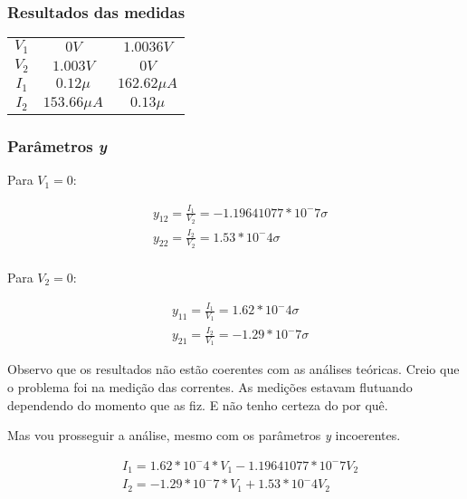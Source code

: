 \documentclass[12pt,twoside, a4paper, twocolumn]{article}
\begin{document}
\subsubsection{Resultados das medidas}


\begin{center}
    \begin{tabular}{ |c|c|c| }
        \hline
        $V_1$ & $0 V$          & $1.0036 V$     \\
        $V_2$ & $1.003 V$      & $0 V$          \\
        $I_1$ & $0.12 \mu$     & $162.62 \mu A$ \\
        $I_2$ & $153.66 \mu A$ & $0.13 \mu$     \\
        \hline
    \end{tabular}
\end{center}


\subsubsection{Parâmetros \emph{y}}


Para $V_1 = 0$:


\begin{equation}
    \begin{aligned}
         & y_{12} = \frac{I_1}{V_2} =  -1.19641077 * 10^-7 \sigma \\
         & y_{22} = \frac{I_2}{V_2} = 1.53 * 10^-4 \sigma         \\
    \end{aligned}
\end{equation}


Para $V_2 = 0$:


\begin{equation}
    \begin{aligned}
         & y_{11} = \frac{I_1}{V_1} = 1.62 * 10^-4 \sigma  \\
         & y_{21} = \frac{I_2}{V_1} = -1.29 * 10^-7 \sigma
    \end{aligned}
\end{equation}


Observo que os resultados não estão coerentes com as análises teóricas. Creio que o problema foi na medição das correntes. As medições estavam flutuando dependendo do momento que as fiz. E não tenho certeza do por quê.


Mas vou prosseguir a análise, mesmo com os parâmetros \emph{y} incoerentes.


\begin{equation}
    \begin{aligned}
         & I_1 = 1.62 * 10^-4 * V_1 -1.19641077 * 10^-7 V_2 \\
         & I_2 = -1.29 * 10^-7 *  V_1 + 1.53 * 10^-4 V_2    \\
    \end{aligned}
\end{equation}
\end{document}
